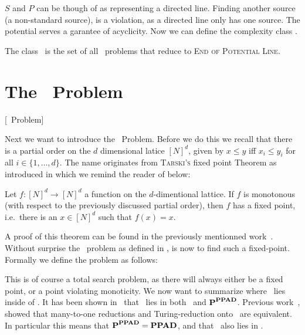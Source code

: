 $S$ and $P$ can be though of as representing a directed line.
Finding another source (a non-standard source), is a violation, as a directed line only has one source.
The potential serves a garantee of acyclicity. Now we can define the complexity class \EOPL.

\begin{definition}[\EOPL]
    The class \EOPL\ is the set of all \TFNP\ problems that reduce to \textsc{End of Potential Line}.
\end{definition}

\section{The \Tarski\ Problem}[\Tarski\ Problem]
\label{sec:tarski_problem}

Next we want to introduce the \Tarski\ Problem.
Before we do this we recall that there is a partial order on the $d$ dimensional latice ${[N]}^d$, given by $x \leq y$ iff $x_i \leq y_i$ for all $i \in \{1,
    \dots, d\}$.
The name originates from \textsc{Tarski's} fixed point Theorem as introduced in  which we remind the reader of below:

\begin{theorem}
    Let $f : {[N]}^d \rightarrow {[N]}^d$ a function on the $d$-dimentional lattice.
    If $f$ is monotonous (with respect to the previously discussed partial order), then $f$ has a fixed point, i.e.\ there is an $x \in {[N]}^d$ such that
    $f(x)=x$.
\end{theorem}

A proof of this theorem can be found in the previously mentionned work~\cite{tarski_lattice-theoretical_1955}.
Without surprise the \Tarski\ problem as defined in , is now to find such a fixed-point.
Formally we define the problem as follows:

This is of course a total search problem, as there will always either be a fixed point, or a point violating monoticity.
We now want to summarize where \Tarski\ lies inside of \TFNP{}.
It has been shown in~\cite{etessami_tarskis_2020} that \Tarski\ lies in both \PLS\ and $\textbf{P}^{\textbf{PPAD}}$.
Previous work~, showed that many-to-one reductions and Turing-reduction onto \PPAD\ are equivalent.
In particular this means that $\textbf{P}^{\textbf{PPAD}} = \textbf{PPAD}$, and that \Tarski\ also lies in \PPAD{}.


